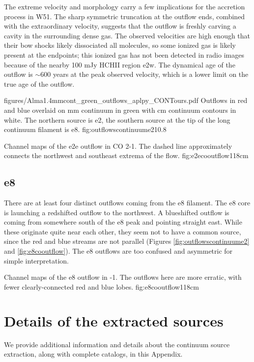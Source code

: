 \documentclass[twocolumn]{aastex61}
\begin{document}
The extreme velocity and morphology carry a few implications for the
accretion process in W51.  The sharp symmetric truncation at the outflow ends,
combined with the extraordinary velocity, suggests that the outflow is freshly
carving a cavity in the surrounding dense gas.  The observed velocities are
high enough that their bow shocks likely dissociated all molecules, so some
ionized gas is likely present at the endpoints; this ionized gas has not been
detected in radio images because of the nearby 100 mJy HCHII region e2w.  The
dynamical age of the outflow is $\sim600$ years at the peak observed velocity,
which is a lower limit on the true age of the outflow.


\Figure
{{figures/Alma1.4mmcont_green_outflows_aplpy_CONTours}.pdf}
{Outflows in red and blue overlaid on mm continuum in green with cm continuum
contours in white.  The northern source is e2, the southern source at the tip
of the long continuum filament is e8.}
{fig:outflowscontinuume2}{1}{0.8\textwidth}


{Channel maps of the e2e outflow in CO 2-1.  The dashed line approximately
connects the northwest and southeast extrema of the flow.}
{fig:e2ecooutflow}{1}{18cm}

\subsection{e8}
There are at least four distinct outflows coming from the e8 filament.
The e8 core is launching a redshifted outflow to the northwest.  A blueshifted
outflow is coming from somewhere south of the e8 peak and pointing straight
east.  While these originate quite near each other, they seem not to have
a common source, since the red and blue streams are not parallel (Figures
\ref{fig:outflowscontinuume2} and \ref{fig:e8cooutflow}).  The e8 outflows are too
confused and asymmetric for simple interpretation.


{Channel maps of the e8 outflow in -1.  The outflows here are more
erratic, with fewer clearly-connected red and blue lobes.}
{fig:e8cooutflow}{1}{18cm}

\section{Details of the extracted sources}
\label{sec:contsrcs}
We provide additional information and details about the continuum
source extraction, along with complete catalogs, in this Appendix.
\end{document}
